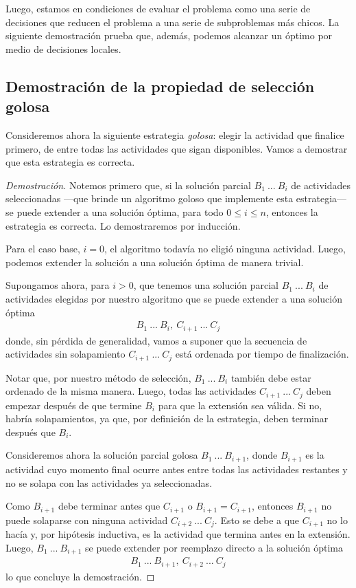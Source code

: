 Luego, estamos en condiciones de evaluar el problema como una serie de decisiones que reducen el problema a una serie de subproblemas más chicos. La siguiente demostración prueba que, además, podemos alcanzar un óptimo por medio de decisiones locales. 

\subsection{Demostración de la propiedad de selección golosa} Consideremos ahora la siguiente estrategia \textit{golosa}: elegir la actividad que finalice primero, de entre todas las actividades que sigan disponibles. Vamos a demostrar que esta estrategia es correcta.

\begin{proof}[Demostración]
    Notemos primero que, si la solución parcial $B_1\ ...\ B_i$ de actividades seleccionadas ---que brinde un algoritmo goloso que implemente esta estrategia--- se puede extender a una solución óptima, para todo $0 \leq i \leq n$, entonces la estrategia es correcta. Lo demostraremos por inducción.

    Para el caso base, $i = 0$, el algoritmo todavía no eligió ninguna actividad. Luego, podemos extender la solución a una solución óptima de manera trivial.

    Supongamos ahora, para $i > 0$, que tenemos una solución parcial $B_1\ ...\ B_i$ de actividades elegidas por nuestro algoritmo que se puede extender a una solución óptima
    \begin{align}\nonumber
        B_1\ ...\ B_i,\ C_{i+1}\ ...\ C_j
    \end{align}
    donde, sin pérdida de generalidad, vamos a suponer que la secuencia de actividades sin solapamiento $C_{i+1}\ ...\ C_j$ está ordenada por tiempo de finalización. 

    Notar que, por nuestro método de selección, $B_1\ ...\ B_i$ también debe estar ordenado de la misma manera. Luego, todas las actividades $C_{i+1}\ ...\ C_j$ deben empezar después de que termine $B_i$ para que la extensión sea válida. Si no, habría solapamientos, ya que, por definición de la estrategia, deben terminar después que $B_i$.

    Consideremos ahora la solución parcial golosa $B_1\ ...\ B_{i+1}$, donde $B_{i+1}$ es la actividad cuyo momento final ocurre antes entre todas las actividades restantes y no se solapa con las actividades ya seleccionadas. 

    Como $B_{i+1}$ debe terminar antes que $C_{i+1}$ o $B_{i+1} = C_{i+1}$, entonces $B_{i+1}$ no puede solaparse con ninguna actividad $C_{i+2}\ ...\ C_j$. Esto se debe a que $C_{i+1}$ no lo hacía y, por hipótesis inductiva, es la actividad que termina antes en la extensión. Luego, $B_1\ ...\ B_{i+1}$ se puede extender por reemplazo directo a la solución óptima 
    \begin{align}\nonumber
        B_1\ ...\ B_{i+1},\ C_{i+2}\ ...\ C_j
    \end{align}
    lo que concluye la demostración.
\end{proof}

